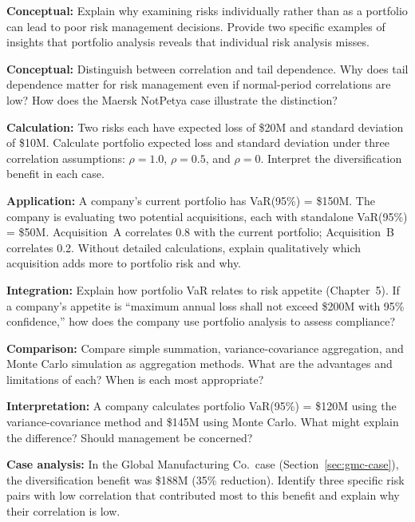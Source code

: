 \documentclass[11pt,openany]{book}
\begin{document}
\begin{discussionquestions}
\item \textbf{Conceptual:} Explain why examining risks individually rather
  than as a portfolio can lead to poor risk management decisions. Provide two
  specific examples of insights that portfolio analysis reveals that
  individual risk analysis misses.

\item \textbf{Conceptual:} Distinguish between correlation and tail
  dependence. Why does tail dependence matter for risk management even if
  normal-period correlations are low? How does the Maersk NotPetya case
  illustrate the distinction?

\item \textbf{Calculation:} Two risks each have expected loss of \$20M and
  standard deviation of \$10M. Calculate portfolio expected loss and standard
  deviation under three correlation assumptions: \(\rho = 1.0\),
  \(\rho = 0.5\), and \(\rho = 0\). Interpret the diversification benefit in
  each case.

\item \textbf{Application:} A company's current portfolio has VaR(95\%) =
  \$150M. The company is evaluating two potential acquisitions, each with
  standalone VaR(95\%) = \$50M. Acquisition~A correlates 0.8 with the current
  portfolio; Acquisition~B correlates 0.2. Without detailed calculations,
  explain qualitatively which acquisition adds more to portfolio risk and why.

\item \textbf{Integration:} Explain how portfolio VaR relates to risk appetite
  (Chapter~5). If a company's appetite is ``maximum annual loss shall not
  exceed \$200M with 95\% confidence,'' how does the company use portfolio
  analysis to assess compliance?

\item \textbf{Comparison:} Compare simple summation, variance-covariance
  aggregation, and Monte Carlo simulation as aggregation methods. What are the
  advantages and limitations of each? When is each most appropriate?

\item \textbf{Interpretation:} A company calculates portfolio VaR(95\%) =
  \$120M using the variance-covariance method and \$145M using Monte Carlo.
  What might explain the difference? Should management be concerned?

\item \textbf{Case analysis:} In the Global Manufacturing Co.\ case
  (Section~\ref{sec:gmc-case}), the diversification benefit was \$188M (35\%
  reduction). Identify three specific risk pairs with low correlation that
  contributed most to this benefit and explain why their correlation is low.


\end{discussionquestions}
\end{document}
